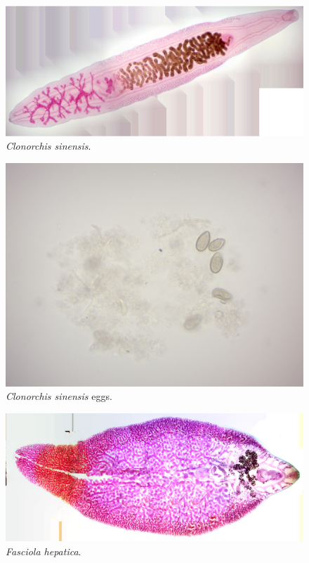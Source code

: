 \begin{figure}

{\centering \includegraphics[width=0.7\linewidth]{./figures/rotifera/clonorchis_sinensis_wm}

}

\caption{\emph{Clonorchis sinensis}.}\label{fig:clonorchis}
\end{figure}

\begin{figure}

{\centering \includegraphics[width=0.7\linewidth]{./figures/rotifera/clonorchis_eggs}

}

\caption{\emph{Clonorchis sinensis} eggs.}\label{fig:clonorchis_eggs}
\end{figure}


\begin{figure}

{\centering \includegraphics[width=0.7\linewidth]{./figures/rotifera/fasciola_hepatica}

}

\caption{\emph{Fasciola hepatica}.}\label{fig:fasciola}
\end{figure}

